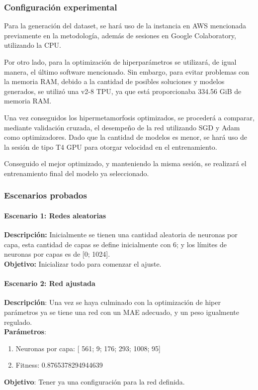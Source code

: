 \subsubsection{Configuración experimental}

Para la generación del dataset, se hará uso de la instancia en AWS mencionada previamente en la metodología, además de sesiones en Google Colaboratory, utilizando la CPU.

Por otro lado, para la optimización de hiperparámetros se utilizará, de igual manera, el último software mencionado. Sin embargo, para evitar problemas con la memoria RAM, debido a la cantidad de posibles soluciones y modelos generados, se utilizó una v2-8 TPU, ya que está proporcionaba 334.56 GiB de memoria RAM.

Una vez conseguidos los hipermetamorfosis optimizados, se procederá a comparar, mediante validación cruzada, el desempeño de la red utilizando SGD y Adam como optimizadores. Dado que la cantidad de modelos es menor, se hará uso de la sesión de tipo T4 GPU para otorgar velocidad en el entrenamiento.

Conseguido el mejor optimizado, y manteniendo la misma sesión, se realizará el entrenamiento final del modelo ya seleccionado.

\subsubsection{Escenarios probados}
\paragraph{Escenario 1: Redes aleatorias}
\textbf{Descripción:} Inicialmente se tienen una cantidad aleatoria de neuronas por capa, esta cantidad de capas se define inicialmente con 6; y los límites de neuronas por capas es de [0; 1024].\\
\textbf{Objetivo:} Inicializar todo para comenzar el ajuste.\\
\paragraph{Escenario 2: Red ajustada}
\textbf{Descripción}: Una vez se haya culminado con la optimización de hiper parámetros ya se tiene una red con un MAE adecuado, y un peso igualmente regulado.\\
\textbf{Parámetros}:
\begin{enumerate}
    \item Neuronas por capa: [ 561; 9; 176; 293; 1008; 95]
    \item Fitness: 0.8765378294944639        
\end{enumerate}
\textbf{Objetivo}: Tener ya una configuración para la red definida.\\


